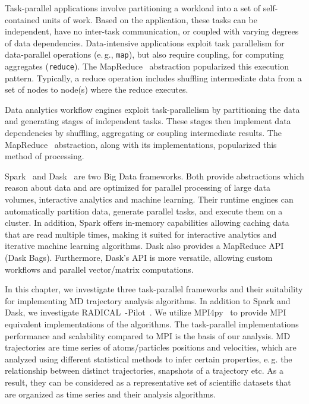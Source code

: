 \label{sec:task-par}

Task-parallel applications involve partitioning a workload into a set of self-contained units of work.
Based on the application, these tasks can be independent, have no inter-task communication, or coupled with varying degrees of data dependencies.
Data-intensive applications exploit task parallelism for data-parallel operations (e.\,g., \texttt{map}), but also require coupling, for computing aggregates (\texttt{reduce}).
The MapReduce~\cite{dean2004mapreduce} abstraction popularized this execution pattern.
Typically, a reduce operation includes shuffling intermediate data from a set of nodes to node(s) where the reduce executes.

Data analytics workflow engines exploit task-parallelism by partitioning the data and generating stages of independent tasks.
These stages then implement data dependencies by shuffling, aggregating or coupling intermediate results.
The MapReduce~\cite{dean2004mapreduce} abstraction, along with its implementations, popularized this method of processing.

Spark~\cite{zaharia2010spark} and Dask~\cite{rocklin2015dask} are two Big Data frameworks.
Both provide abstractions which reason about data and are optimized for parallel processing of large data volumes, interactive analytics and machine learning.
Their runtime engines can automatically partition data, generate parallel tasks, and execute them on a cluster.
In addition, Spark offers in-memory capabilities allowing caching data that are read multiple times, making it suited for interactive analytics and iterative machine learning algorithms.
Dask also provides a MapReduce API (Dask Bags).
Furthermore, Dask's API is more versatile, allowing custom workflows and parallel vector/matrix computations.

In this chapter, we investigate three task-parallel frameworks and their suitability for implementing MD trajectory analysis algorithms.
In addition to Spark and Dask, we investigate RADICAL~-Pilot~\cite{merzky2019using}.
We utilize MPI4py~\cite{dalcin2005mpi} to provide MPI equivalent implementations of the algorithms.
The task-parallel implementations performance and scalability compared to MPI is the basis of our analysis. 
MD trajectories are time series of atoms/particles positions and velocities, which are analyzed using different statistical methods to infer certain properties, e.\,g. the relationship between distinct trajectories, snapshots of a trajectory etc.
As a result, they can be considered as a representative set of scientific datasets that are organized as time series and their analysis algorithms. 

